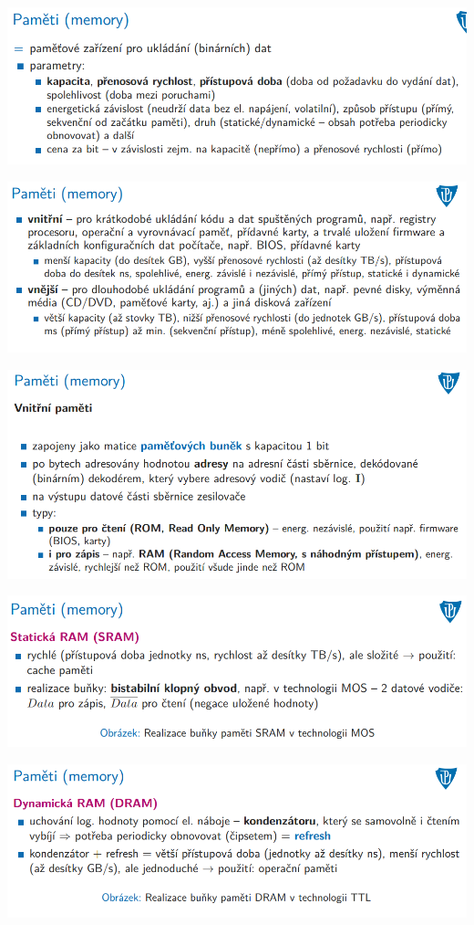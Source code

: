 \documentclass[10pt,a4paper]{article}
\begin{document}
\includegraphics[scale=0.65]{img/prvni_odstavec/otazka6/pamet1.png}

\includegraphics[scale=0.65]{img/prvni_odstavec/otazka6/pamet2.png}

\includegraphics[scale=0.65]{img/prvni_odstavec/otazka6/pamet3.png}

\includegraphics[scale=0.65]{img/prvni_odstavec/otazka6/pamet4.png}

\includegraphics[scale=0.65]{img/prvni_odstavec/otazka6/pamet5.png}
\end{document}
